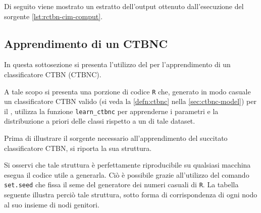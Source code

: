 \vspace*{8pt}

Di seguito viene mostrato un estratto dell'output ottenuto dall'esecuzione del sorgente \ref{lst:rctbn-cim-comput}.

\vspace*{8pt}\vspace*{8pt}

\subsection{Apprendimento di un CTBNC}
In questa sottosezione si presenta l'utilizzo del \pacchettor{} per l'apprendimento di un classificatore \acs{CTBN} (\acs{CTBNC}).

A tale scopo si presenta una porzione di codice \lstinline$R$ che, generato in modo casuale un classificatore \acs{CTBN} valido (si veda la \autoref{defn:ctbnc} nella \vref{sec:ctbnc-model}) per il , utilizza la funzione \lstinline[language=rstats]{learn_ctbnc} per apprenderne i parametri e la distribuzione a priori delle classi rispetto a un \emph{} di tale dataset.

Prima di illustrare il sorgente necessario all'apprendimento del succitato classificatore \acs{CTBN}, si riporta la sua struttura.

Si osservi che tale struttura è perfettamente riproducibile su qualsiasi macchina esegua il codice utile a generarla. Ciò è possibile grazie all'utilizzo del comando \lstinline[language=rstats]{set.seed} che fissa il seme del generatore dei numeri casuali di \lstinline$R$. La tabella seguente illustra perciò tale struttura, sotto forma di corrispondenza di ogni nodo al suo insieme di nodi genitori.

